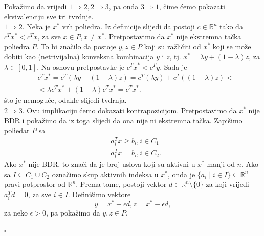\documentclass[a4paper, utf8, 11pt, colorlinks]{book}
\newenvironment{proof}{{Dokaz:}}{\hfill$\square$}
\begin{document}
\begin{proof}
      Pokažimo da vrijedi $1 \Rightarrow 2, 2 \Rightarrow 3$, pa onda $3 \Rightarrow 1$, čime ćemo pokazati ekvivalenciju sve tri tvrdnje. \\
      $1 \Rightarrow 2$. Neka je $x^*$ vrh poliedra. Iz definicije slijedi da 
      postoji $c\in \mathbb{R}^n$ tako da $c^Tx^* < c^T x$, za sve $x \in P, x \neq x^*$. Pretpostavimo da $x^*$ nije ekstremna tačka poliedra $P$. To bi značilo da postoje $y,z \in P$ koji su ražličiti od $x^*$ koji se može dobiti kao (netrivijalna) konveksna kombinacija $y$ i $z$, tj. $x^* = \lambda y + (1 - \lambda) z $, za $\lambda \in [0,1 ]$. Na osnovu pretpostavke je $c^T x^* < c^T y$. Sada je 
      \begin{align}
          &c^T x^* = c^T ( \lambda y + (1 - \lambda) z )  = c^T( \lambda y) + c^T((1- \lambda) z) < \nonumber \\
          &< \lambda c^T x^* + ( 1 - \lambda) c^T x^* = c^T x^*.
      \end{align}
      što je nemoguće, odakle slijedi tvdrnja. \\
      $2 \Rightarrow 3$.
       Ovu implikaciju ćemo dokazati kontrapozicijom. Pretpostavimo da $x^*$ nije BDR i pokažimo da iz toga slijedi da ona nije ni ekstremna tačka.
       Zapišimo poliedar $P$ sa 
       \begin{align}
            & a_i^T x \geq b_i, i \in C_1 \\
            & a_i^T x  = b_i, i \in C_2.
       \end{align}
       Ako $x^*$ nije BDR, to znači da je broj uslova koji su aktivni u $x^*$ manji od $n$. 
       Ako sa $I \subseteq C_1 \cup C_2$ označimo skup aktivnih indeksa u $x^*$, onda 
       je $\{ a_i \mid i \in I \} \subseteq \mathbb{R}^n$ pravi potprostor od $\mathbb{R}^n$.  Prema tome, postoji vektor $d \in \mathbb{R}^n \setminus \{0\}$ za koji vrijedi $a_i^T d = 0$, za sve $i \in I$. Definišimo vektore 
       $$ y = x^* + \epsilon d, z = x^* - \epsilon d, $$
       za neko $\epsilon > 0$, pa pokažimo da $y, z \in P$.
       

\end{proof}
\end{document}
